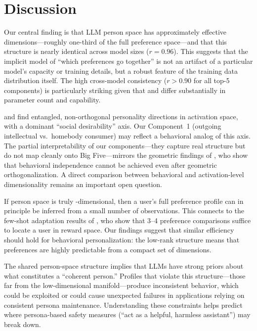 \section{Discussion}
\label{sec:discussion}

Our central finding is that LLM person space has approximately \effrank{} effective dimensions---roughly one-third of the full preference space---and that this structure is nearly identical across model sizes ($r = 0.96$).
This suggests that the implicit model of ``which preferences go together'' is not an artifact of a particular model's capacity or training details, but a robust feature of the training data distribution itself.
The high cross-model consistency ($r > 0.90$ for all top-5 components) is particularly striking given that \nano and \mini differ substantially in parameter count and capability.

\citet{chen2025persona} and \citet{bhandari2026personality} find entangled, non-orthogonal personality directions in activation space, with a dominant ``social desirability'' axis.
Our Component~1 (outgoing intellectual vs.\ homebody consumer) may reflect a behavioral analog of this axis.
The partial interpretability of our components---they capture real structure but do not map cleanly onto Big Five---mirrors the geometric findings of \citet{bhandari2026personality}, who show that behavioral independence cannot be achieved even after geometric orthogonalization.
A direct comparison between behavioral and activation-level dimensionality remains an important open question.

If person space is truly \effrank-dimensional, then a user's full preference profile can in principle be inferred from a small number of observations.
This connects to the few-shot adaptation results of \citet{bose2025lore}, who show that 3--4 preference comparisons suffice to locate a user in reward space.
Our findings suggest that similar efficiency should hold for behavioral personalization: the low-rank structure means that preferences are highly predictable from a compact set of dimensions.

The shared person-space structure implies that LLMs have strong priors about what constitutes a ``coherent person.''
Profiles that violate this structure---those far from the low-dimensional manifold---produce inconsistent behavior, which could be exploited or could cause unexpected failures in applications relying on consistent persona maintenance.
Understanding these constraints helps predict where persona-based safety measures (\eg ``act as a helpful, harmless assistant'') may break down.

